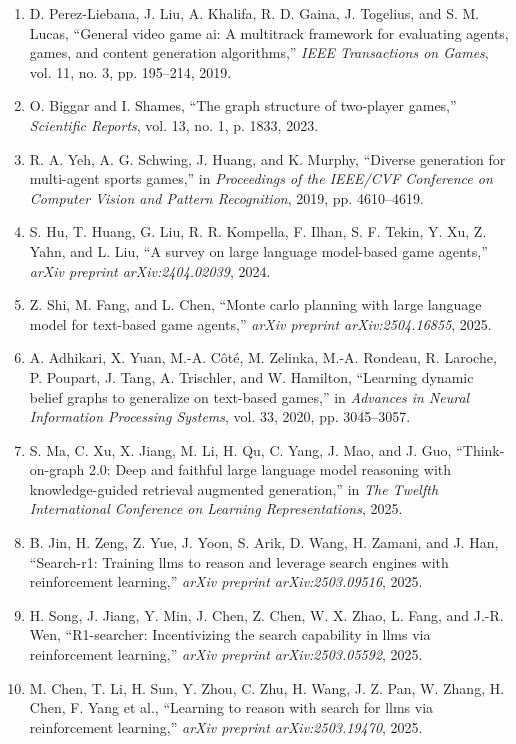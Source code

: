 \documentclass[10pt,UTF8,fontset=fandol]{ctexart}
\begin{document}
\begin{enumerate}[leftmargin=2.4em,labelsep=0.4em,itemsep=0.15em]
\item D. Perez-Liebana, J. Liu, A. Khalifa, R. D. Gaina, J. Togelius, and S. M. Lucas, ``General video game ai: A multitrack framework for evaluating agents, games, and content generation algorithms,'' \textit{IEEE Transactions on Games}, vol. 11, no. 3, pp. 195--214, 2019.
\item O. Biggar and I. Shames, ``The graph structure of two-player games,'' \textit{Scientific Reports}, vol. 13, no. 1, p. 1833, 2023.
\item R. A. Yeh, A. G. Schwing, J. Huang, and K. Murphy, ``Diverse generation for multi-agent sports games,'' in \textit{Proceedings of the IEEE/CVF Conference on Computer Vision and Pattern Recognition}, 2019, pp. 4610--4619.
\item S. Hu, T. Huang, G. Liu, R. R. Kompella, F. Ilhan, S. F. Tekin, Y. Xu, Z. Yahn, and L. Liu, ``A survey on large language model-based game agents,'' \textit{arXiv preprint arXiv:2404.02039}, 2024.
\item Z. Shi, M. Fang, and L. Chen, ``Monte carlo planning with large language model for text-based game agents,'' \textit{arXiv preprint arXiv:2504.16855}, 2025.
\item A. Adhikari, X. Yuan, M.-A. Côté, M. Zelinka, M.-A. Rondeau, R. Laroche, P. Poupart, J. Tang, A. Trischler, and W. Hamilton, ``Learning dynamic belief graphs to generalize on text-based games,'' in \textit{Advances in Neural Information Processing Systems}, vol. 33, 2020, pp. 3045--3057.
\item S. Ma, C. Xu, X. Jiang, M. Li, H. Qu, C. Yang, J. Mao, and J. Guo, ``Think-on-graph 2.0: Deep and faithful large language model reasoning with knowledge-guided retrieval augmented generation,'' in \textit{The Twelfth International Conference on Learning Representations}, 2025.
\item B. Jin, H. Zeng, Z. Yue, J. Yoon, S. Arik, D. Wang, H. Zamani, and J. Han, ``Search-r1: Training llms to reason and leverage search engines with reinforcement learning,'' \textit{arXiv preprint arXiv:2503.09516}, 2025.
\item H. Song, J. Jiang, Y. Min, J. Chen, Z. Chen, W. X. Zhao, L. Fang, and J.-R. Wen, ``R1-searcher: Incentivizing the search capability in llms via reinforcement learning,'' \textit{arXiv preprint arXiv:2503.05592}, 2025.
\item M. Chen, T. Li, H. Sun, Y. Zhou, C. Zhu, H. Wang, J. Z. Pan, W. Zhang, H. Chen, F. Yang et al., ``Learning to reason with search for llms via reinforcement learning,'' \textit{arXiv preprint arXiv:2503.19470}, 2025.

\end{enumerate}
\end{document}
